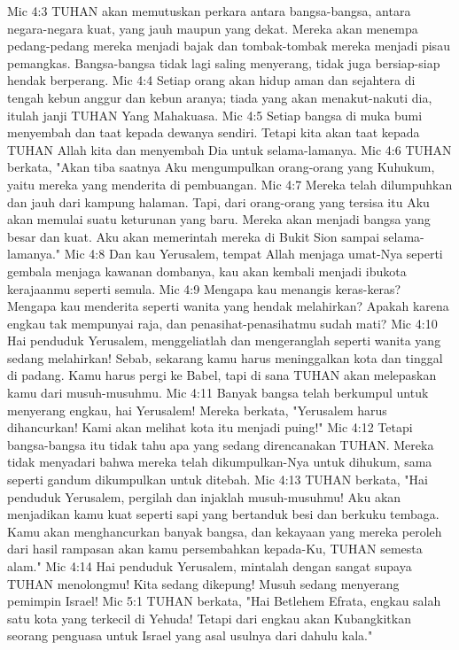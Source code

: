 Mic 4:3  TUHAN akan memutuskan perkara antara bangsa-bangsa, antara negara-negara kuat, yang jauh maupun yang dekat. Mereka akan menempa pedang-pedang mereka menjadi bajak dan tombak-tombak mereka menjadi pisau pemangkas. Bangsa-bangsa tidak lagi saling menyerang, tidak juga bersiap-siap hendak berperang.
Mic 4:4  Setiap orang akan hidup aman dan sejahtera di tengah kebun anggur dan kebun aranya; tiada yang akan menakut-nakuti dia, itulah janji TUHAN Yang Mahakuasa.
Mic 4:5  Setiap bangsa di muka bumi menyembah dan taat kepada dewanya sendiri. Tetapi kita akan taat kepada TUHAN Allah kita dan menyembah Dia untuk selama-lamanya.
Mic 4:6  TUHAN berkata, "Akan tiba saatnya Aku mengumpulkan orang-orang yang Kuhukum, yaitu mereka yang menderita di pembuangan.
Mic 4:7  Mereka telah dilumpuhkan dan jauh dari kampung halaman. Tapi, dari orang-orang yang tersisa itu Aku akan memulai suatu keturunan yang baru. Mereka akan menjadi bangsa yang besar dan kuat. Aku akan memerintah mereka di Bukit Sion sampai selama-lamanya."
Mic 4:8  Dan kau Yerusalem, tempat Allah menjaga umat-Nya seperti gembala menjaga kawanan dombanya, kau akan kembali menjadi ibukota kerajaanmu seperti semula.
Mic 4:9  Mengapa kau menangis keras-keras? Mengapa kau menderita seperti wanita yang hendak melahirkan? Apakah karena engkau tak mempunyai raja, dan penasihat-penasihatmu sudah mati?
Mic 4:10  Hai penduduk Yerusalem, menggeliatlah dan mengeranglah seperti wanita yang sedang melahirkan! Sebab, sekarang kamu harus meninggalkan kota dan tinggal di padang. Kamu harus pergi ke Babel, tapi di sana TUHAN akan melepaskan kamu dari musuh-musuhmu.
Mic 4:11  Banyak bangsa telah berkumpul untuk menyerang engkau, hai Yerusalem! Mereka berkata, "Yerusalem harus dihancurkan! Kami akan melihat kota itu menjadi puing!"
Mic 4:12  Tetapi bangsa-bangsa itu tidak tahu apa yang sedang direncanakan TUHAN. Mereka tidak menyadari bahwa mereka telah dikumpulkan-Nya untuk dihukum, sama seperti gandum dikumpulkan untuk ditebah.
Mic 4:13  TUHAN berkata, "Hai penduduk Yerusalem, pergilah dan injaklah musuh-musuhmu! Aku akan menjadikan kamu kuat seperti sapi yang bertanduk besi dan berkuku tembaga. Kamu akan menghancurkan banyak bangsa, dan kekayaan yang mereka peroleh dari hasil rampasan akan kamu persembahkan kepada-Ku, TUHAN semesta alam."
Mic 4:14  Hai penduduk Yerusalem, mintalah dengan sangat supaya TUHAN menolongmu! Kita sedang dikepung! Musuh sedang menyerang pemimpin Israel!
Mic 5:1  TUHAN berkata, "Hai Betlehem Efrata, engkau salah satu kota yang terkecil di Yehuda! Tetapi dari engkau akan Kubangkitkan seorang penguasa untuk Israel yang asal usulnya dari dahulu kala."
